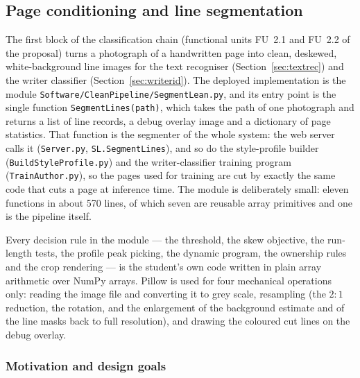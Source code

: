 \subsection{Page conditioning and line segmentation}
\label{sec:segmentation}

The first block of the classification chain (functional units FU~2.1 and FU~2.2 of the proposal) turns a photograph of a handwritten page into clean, deskewed, white-background line images for the text recogniser (Section~\ref{sec:textrec}) and the writer classifier (Section~\ref{sec:writerid}).
The deployed implementation is the module \texttt{Software/CleanPipeline/SegmentLean.py}, and its entry point is the single function \texttt{SegmentLines(path)}, which takes the path of one photograph and returns a list of line records, a debug overlay image and a dictionary of page statistics.
That function is the segmenter of the whole system: the web server calls it (\texttt{Server.py}, \texttt{SL.SegmentLines}), and so do the style-profile builder (\texttt{BuildStyleProfile.py}) and the writer-classifier training program (\texttt{TrainAuthor.py}), so the pages used for training are cut by exactly the same code that cuts a page at inference time.
The module is deliberately small: eleven functions in about 570 lines, of which seven are reusable array primitives and one is the pipeline itself.

Every decision rule in the module --- the threshold, the skew objective, the run-length tests, the profile peak picking, the dynamic program, the ownership rules and the crop rendering --- is the student's own code written in plain array arithmetic over NumPy arrays.
Pillow is used for four mechanical operations only: reading the image file and converting it to grey scale, resampling (the $2{:}1$ reduction, the rotation, and the enlargement of the background estimate and of the line masks back to full resolution), and drawing the coloured cut lines on the debug overlay.

\subsubsection{Motivation and design goals}

